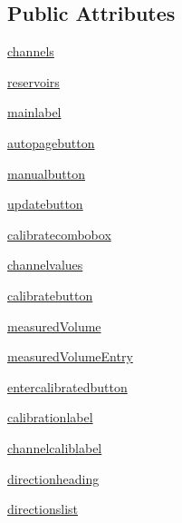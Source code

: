 \subsection*{Public Attributes}
\begin{DoxyCompactItemize}
\item 
\mbox{\hyperlink{class_g_u_i_1_1_settings_page_a3e866616dc7fc00764bf6f3d3729d39b}{channels}}
\item 
\mbox{\hyperlink{class_g_u_i_1_1_settings_page_adacd9bf9000d80601695704d7dd45c92}{reservoirs}}
\item 
\mbox{\hyperlink{class_g_u_i_1_1_settings_page_aab0221843744f8c19e3ef6ed71a0491b}{mainlabel}}
\item 
\mbox{\hyperlink{class_g_u_i_1_1_settings_page_a856b22dfda4b6ff01ceb0b00da8a7900}{autopagebutton}}
\item 
\mbox{\hyperlink{class_g_u_i_1_1_settings_page_a7eb64836cd086c59c2c3cb4053afa8c3}{manualbutton}}
\item 
\mbox{\hyperlink{class_g_u_i_1_1_settings_page_ac8b17c2d99c2f905ee0f186edcf805eb}{updatebutton}}
\item 
\mbox{\hyperlink{class_g_u_i_1_1_settings_page_a263638f3e5f4ffadf0c14c5e68361911}{calibratecombobox}}
\item 
\mbox{\hyperlink{class_g_u_i_1_1_settings_page_a15503379126de9f497c9eb69d865205d}{channelvalues}}
\item 
\mbox{\hyperlink{class_g_u_i_1_1_settings_page_a0113902645faa7c93851c52248552cb5}{calibratebutton}}
\item 
\mbox{\hyperlink{class_g_u_i_1_1_settings_page_a9f46ed79f4a6a66ba196c94c0a38139d}{measured\+Volume}}
\item 
\mbox{\hyperlink{class_g_u_i_1_1_settings_page_aa0045a745b6fbd7ab096fa52498579c9}{measured\+Volume\+Entry}}
\item 
\mbox{\hyperlink{class_g_u_i_1_1_settings_page_a54d89064888ff0cdfe196474907b2655}{entercalibratedbutton}}
\item 
\mbox{\hyperlink{class_g_u_i_1_1_settings_page_ad38f6bb9d5377fe8b989540271687a7f}{calibrationlabel}}
\item 
\mbox{\hyperlink{class_g_u_i_1_1_settings_page_a159ccaea3679133a984c14e5b7831fb8}{channelcaliblabel}}
\item 
\mbox{\hyperlink{class_g_u_i_1_1_settings_page_a12da53f2f5b25b0d5080fb550cd83f3c}{directionheading}}
\item 
\mbox{\hyperlink{class_g_u_i_1_1_settings_page_a6b63270f039a9bc86b9415c7b34df962}{directionslist}}

\end{DoxyCompactItemize}
